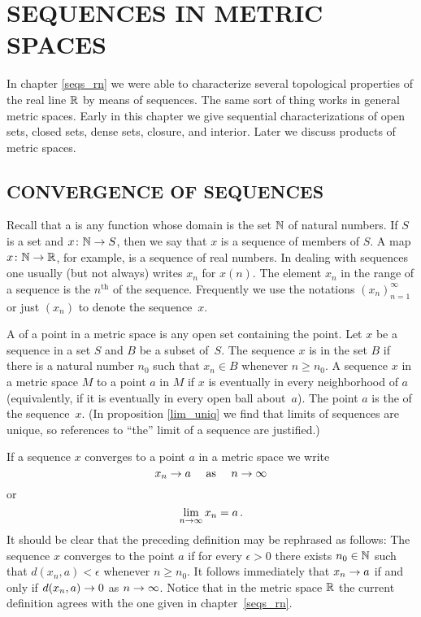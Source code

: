 \chapter{SEQUENCES IN METRIC SPACES}\label{seqs_msps}



In chapter \ref{seqs_rn} we were able to characterize several topological properties of the
real line $\mathbb{R}$ by means of sequences. The same sort of thing works in general metric spaces.
Early in this chapter we give sequential characterizations of open sets, closed sets, dense
sets, closure, and interior.  Later we discuss products of metric spaces.


\section{CONVERGENCE OF SEQUENCES}
Recall that a
 is any function whose domain is the set $\mathbb{N}$ of natural numbers.  If $S$ is a
set and $x \colon \mathbb{N} \rightarrow S$, then we say that $x$ is a sequence of members of $S$.  A map $x
\colon \mathbb{N} \rightarrow \mathbb{R}$, for example, is a sequence of real numbers.  In dealing with sequences one
usually (but not always) writes $x_n$ for $x(n)$.  The element $x_n$ in the range of a
sequence is the $n^{\text{th}}$
 of the sequence. Frequently we use the notations $(x_n)_{n=1}^{\infty}$ or just
$(x_n)$ to denote the sequence~$x$.

\begin{defn}\label{defn_nbhd_pt} A
 of a point in a metric space is any open set containing the point.  Let $x$
be a sequence in a set $S$ and $B$ be a subset of~$S$.  The sequence $x$ is
 in the set $B$ if there is a natural number $n_0$ such that $x_n \in B$
whenever $n \ge n_0$.  A sequence $x$ in a metric space $M$
 to a point $a$ in $M$ if $x$ is eventually in every neighborhood of $a$
(equivalently, if it is eventually in every open ball about~$a$). The point $a$ is the
 of the sequence~$x$. (In proposition \ref{lim_uniq} we find that limits of
sequences are unique, so references to ``the'' limit of a sequence are justified.)

If a sequence $x$ converges to a point $a$ in a metric space we write
   \[ x_n \rightarrow a  \quad \text{ as } \quad n \rightarrow \infty \]
or
    \[ \lim_{n \rightarrow \infty}x_n = a\,. \]
It should be clear that the preceding definition may be rephrased as follows: The sequence $x$
converges to the point $a$ if for every $\epsilon > 0$ there exists $n_0 \in \mathbb{N}$ such that
$d(x_n,a) < \epsilon$ whenever $n \ge n_0$.  It follows immediately that $x_n \rightarrow a$ if and
only if $d(x_n,a) \rightarrow 0$ as $n \rightarrow \infty$.  Notice that in the metric space $\mathbb{R}$ the
current definition agrees with the one given in chapter~\ref{seqs_rn}.
\end{defn}








